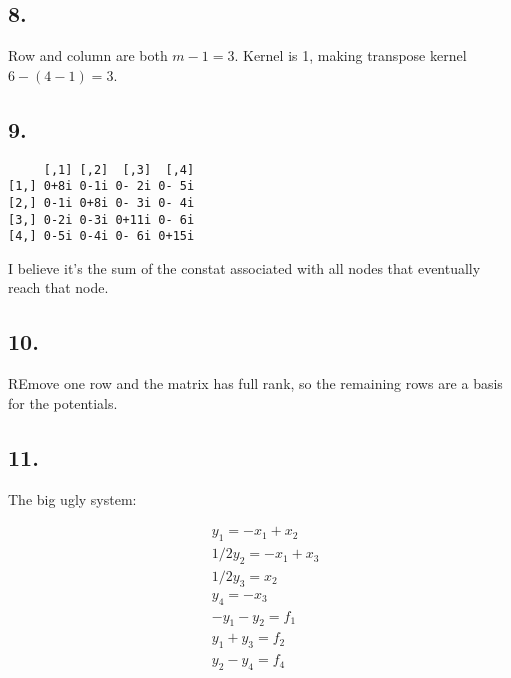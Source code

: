\documentclass[]{article}
\newenvironment{Shaded}{\begin{snugshade}}{\end{snugshade}}
\newcommand{\DataTypeTok}[1]{\textcolor[rgb]{0.00,0.34,0.68}{#1}}
\newcommand{\DecValTok}[1]{\textcolor[rgb]{0.69,0.50,0.00}{#1}}
\newcommand{\KeywordTok}[1]{\textcolor[rgb]{0.12,0.11,0.11}{\textbf{#1}}}
\newcommand{\NormalTok}[1]{\textcolor[rgb]{0.12,0.11,0.11}{#1}}
\newcommand{\OperatorTok}[1]{\textcolor[rgb]{0.12,0.11,0.11}{#1}}
\newcommand{\StringTok}[1]{\textcolor[rgb]{0.75,0.01,0.01}{#1}}
\begin{document}
\hypertarget{section-7}{%
\subsection{8.}\label{section-7}}

Row and column are both \(m-1 = 3\). Kernel is 1, making transpose
kernel \(6 - (4-1) = 3\).

\hypertarget{section-8}{%
\subsection{9.}\label{section-8}}

\begin{Shaded}
\end{Shaded}

\begin{verbatim}
     [,1] [,2]  [,3]  [,4]
[1,] 0+8i 0-1i 0- 2i 0- 5i
[2,] 0-1i 0+8i 0- 3i 0- 4i
[3,] 0-2i 0-3i 0+11i 0- 6i
[4,] 0-5i 0-4i 0- 6i 0+15i
\end{verbatim}

I believe it's the sum of the constat associated with all nodes that
eventually reach that node.

\hypertarget{section-9}{%
\subsection{10.}\label{section-9}}

REmove one row and the matrix has full rank, so the remaining rows are a
basis for the potentials.

\hypertarget{section-10}{%
\subsection{11.}\label{section-10}}

The big ugly system:

\[
    \begin{aligned}
    & y_1 = -x_1 + x_2 \\ 
    & 1/2y_2 = -x_1 + x_3 \\ 
    & 1/2 y_3 = x_2 \\ 
    & y_4 = -x_3 \\ 
    & -y_1 - y_2 = f_1 \\ 
    & y_1 + y_3 = f_2 \\ 
    & y_2 - y_4 = f_4
    \end{aligned}
\]
\end{document}
